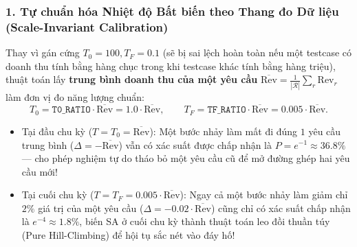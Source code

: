 \documentclass[11pt,a4paper]{article}
\theoremstyle{definition}
\begin{document}
\subsubsection{1. Tự chuẩn hóa Nhiệt độ Bất biến theo Thang đo Dữ liệu (Scale-Invariant Calibration)}
Thay vì gán cứng $T_0 = 100, T_F = 0.1$ (sẽ bị sai lệch hoàn toàn nếu một testcase có doanh thu tính bằng hàng chục trong khi testcase khác tính bằng hàng triệu), thuật toán lấy \textbf{trung bình doanh thu của một yêu cầu} $\overline{\text{Rev}} = \frac{1}{|\mathcal{R}|}\sum_{r} \text{Rev}_r$ làm đơn vị đo năng lượng chuẩn:
\begin{equation}
    T_0 = \texttt{T0\_RATIO} \cdot \overline{\text{Rev}} = 1.0 \cdot \overline{\text{Rev}}, \qquad T_F = \texttt{TF\_RATIO} \cdot \overline{\text{Rev}} = 0.005 \cdot \overline{\text{Rev}}.
\end{equation}
\begin{itemize}[leftmargin=1.5em]
    \item Tại đầu chu kỳ ($T = T_0 = \overline{\text{Rev}}$): Một bước nhảy làm mất đi đúng $1$ yêu cầu trung bình ($\Delta = -\overline{\text{Rev}}$) vẫn có xác suất được chấp nhận là $P = e^{-1} \approx \mathbf{36.8\%}$ --- cho phép nghiệm tự do tháo bỏ một yêu cầu cũ để mở đường ghép hai yêu cầu mới!
    \item Tại cuối chu kỳ ($T = T_F = 0.005 \cdot \overline{\text{Rev}}$): Ngay cả một bước nhảy làm giảm chỉ $2\%$ giá trị của một yêu cầu ($\Delta = -0.02 \cdot \overline{\text{Rev}}$) cũng chỉ có xác suất chấp nhận là $e^{-4} \approx 1.8\%$, biến SA ở cuối chu kỳ thành thuật toán leo đồi thuần túy (Pure Hill-Climbing) để hội tụ sắc nét vào đáy hố!
\end{itemize}
\end{document}
